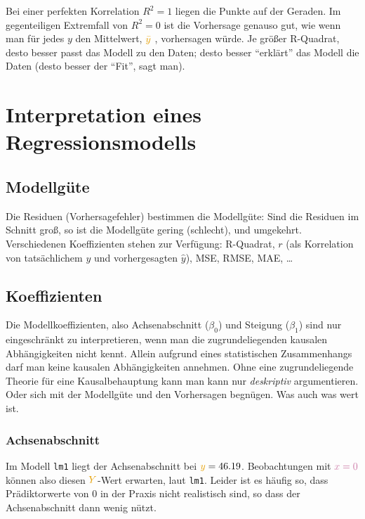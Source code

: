 \documentclass[
  letterpaper,
  oneside,
  open=any]{scrbook}
\theoremstyle{definition}
\theoremstyle{definition}
\theoremstyle{definition}
\theoremstyle{remark}
\begin{document}
Bei einer perfekten Korrelation \(R^2=1\) liegen die Punkte auf der
Geraden. Im gegenteiligen Extremfall von \(R^2=0\) ist die Vorhersage
genauso gut, wie wenn man für jedes \(y\) den Mittelwert,
{\(\color{ycol}{\bar{y}}\)} , vorhersagen würde. Je größer R-Quadrat,
desto besser passt das Modell zu den Daten; desto besser
\enquote{erklärt} das Modell die Daten (desto besser der \enquote{Fit},
sagt man).

\section{Interpretation eines
Regressionsmodells}\label{sec-interpret-reg-mod}

\subsection{Modellgüte}\label{modellguxfcte-1}

Die Residuen (Vorhersagefehler) bestimmen die Modellgüte: Sind die
Residuen im Schnitt groß, so ist die Modellgüte gering (schlecht), und
umgekehrt. Verschiedenen Koeffizienten stehen zur Verfügung: R-Quadrat,
\(r\) (als Korrelation von tatsächlichem \(y\) und vorhergesagten
\(\hat{y}\)), MSE, RMSE, MAE, \ldots{}

\subsection{Koeffizienten}\label{koeffizienten}

Die Modellkoeffizienten, also Achsenabschnitt (\(\beta_0\)) und Steigung
(\(\beta_1\)) sind nur eingeschränkt zu interpretieren, wenn man die
zugrundeliegenden kausalen Abhängigkeiten nicht kennt. Allein aufgrund
eines statistischen Zusammenhangs darf man keine kausalen Abhängigkeiten
annehmen. Ohne eine zugrundeliegende Theorie für eine Kausalbehauptung
kann man kann nur \emph{deskriptiv} argumentieren. Oder sich mit der
Modellgüte und den Vorhersagen begnügen. Was auch was wert ist.

\subsubsection{Achsenabschnitt}\label{achsenabschnitt}

{Im Modell \texttt{lm1} liegt der Achsenabschnitt bei
\(\textcolor{ycol}{y}=46.19\). Beobachtungen mit \(\color{xcol}{x}=0\)
können also diesen \(\textcolor{ycol}{Y}\)-Wert erwarten, laut
\texttt{lm1}.} Leider ist es häufig so, dass Prädiktorwerte von 0 in der
Praxis nicht realistisch sind, so dass der Achsenabschnitt dann wenig
nützt.
\end{document}
